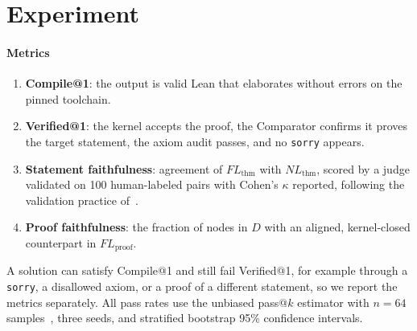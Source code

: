 \documentclass[sigconf,anonymous]{aamas}
\begin{document}
\section{Experiment}
\paragraph{Metrics}
\begin{enumerate}
    \item \textbf{Compile@1}: the output is valid Lean that elaborates without
    errors on the pinned toolchain.
    \item \textbf{Verified@1}: the kernel accepts the proof, the Comparator
    confirms it proves the target statement, the axiom audit passes, and no
    \texttt{sorry} appears.
    \item \textbf{Statement faithfulness}: agreement of $FL_{\text{thm}}$ with
    $NL_{\text{thm}}$, scored by a judge validated on 100 human-labeled pairs
    with Cohen's $\kappa$ reported, following the validation practice
    of~\citet{beyondcompilation2026, mathesis2025}.
    \item \textbf{Proof faithfulness}: the fraction of nodes in $D$ with an
    aligned, kernel-closed counterpart in $FL_{\text{proof}}$.
\end{enumerate}
A solution can satisfy Compile@1 and still fail Verified@1, for example through
a \texttt{sorry}, a disallowed axiom, or a proof of a different statement, so we
report the metrics separately. All pass rates use the unbiased pass@$k$
estimator with $n{=}64$ samples~\citep{chen2021codex}, three seeds, and
stratified bootstrap 95\% confidence intervals.


\end{document}
